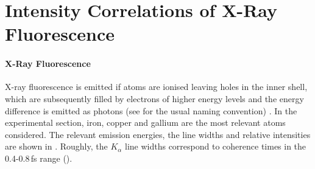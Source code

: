 \section{Intensity Correlations of X-Ray Fluorescence}
\paragraph{X-Ray Fluorescence}
 X-ray fluorescence is emitted if atoms are ionised leaving holes in the inner shell, which are subsequently filled by electrons of higher energy levels and the energy difference is emitted as photons (see  for the usual naming convention) \cite{attwood1999}. In the experimental section, iron, copper and gallium are the most relevant atoms considered. The relevant emission energies, the line widths and relative intensities are shown in .   Roughly, the $K_\alpha$ line widths correspond to coherence times in the 0.4-0.8\,fs range ().
